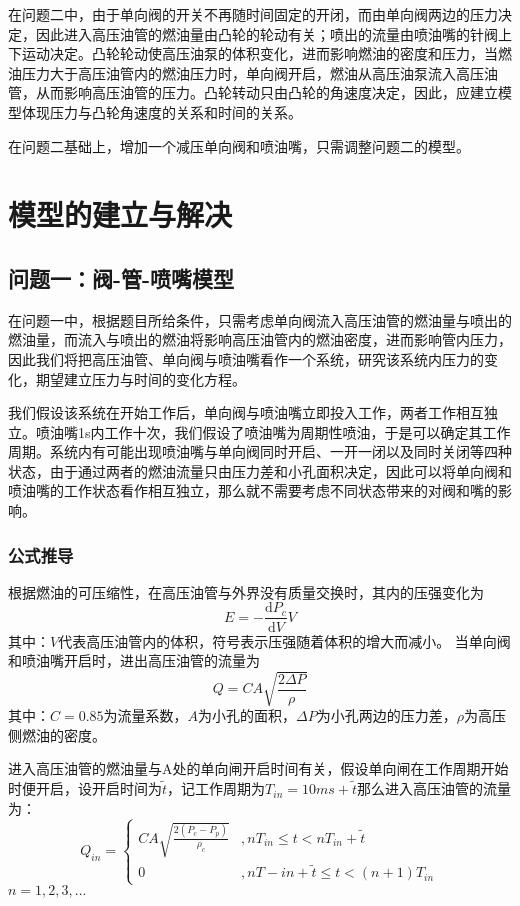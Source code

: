 \documentclass[withoutpreface,bwprint]{cumcmthesis} %
\begin{document}
在问题二中，由于单向阀的开关不再随时间固定的开闭，而由单向阀两边的压力决定，因此进入高压油管的燃油量由凸轮的轮动有关；喷出的流量由喷油嘴的针阀上下运动决定。凸轮轮动使高压油泵的体积变化，进而影响燃油的密度和压力，当燃油压力大于高压油管内的燃油压力时，单向阀开启，燃油从高压油泵流入高压油管，从而影响高压油管的压力。凸轮转动只由凸轮的角速度决定，因此，应建立模型体现压力与凸轮角速度的关系和时间的关系。


在问题二基础上，增加一个减压单向阀和喷油嘴，只需调整问题二的模型。

 
\section{模型的建立与解决}
\subsection{问题一：阀-管-喷嘴模型}
在问题一中，根据题目所给条件，只需考虑单向阀流入高压油管的燃油量与喷出的燃油量，而流入与喷出的燃油将影响高压油管内的燃油密度，进而影响管内压力，因此我们将把高压油管、单向阀与喷油嘴看作一个系统，研究该系统内压力的变化，期望建立压力与时间的变化方程。

我们假设该系统在开始工作后，单向阀与喷油嘴立即投入工作，两者工作相互独立。喷油嘴1s内工作十次，我们假设了喷油嘴为周期性喷油，于是可以确定其工作周期。系统内有可能出现喷油嘴与单向阀同时开启、一开一闭以及同时关闭等四种状态，由于通过两者的燃油流量只由压力差和小孔面积决定，因此可以将单向阀和喷油嘴的工作状态看作相互独立，那么就不需要考虑不同状态带来的对阀和嘴的影响。
\subsubsection{公式推导}
根据燃油的可压缩性，在高压油管与外界没有质量交换时，其内的压强变化为
\begin{equation}
	E = -\frac{\mathrm{d}P_c}{\mathrm{d}V}V
\end{equation}
其中：$V$代表高压油管内的体积，符号表示压强随着体积的增大而减小。
当单向阀和喷油嘴开启时，进出高压油管的流量为
\begin{equation}
	Q = CA\sqrt{\frac{2\Delta P}{\rho}}
\end{equation}
其中：$C = 0.85$为流量系数，$A$为小孔的面积，$\Delta P$为小孔两边的压力差，$\rho$为高压侧燃油的密度。

进入高压油管的燃油量与A处的单向闸开启时间有关，假设单向闸在工作周期开始时便开启，设开启时间为$\widetilde{t}$，记工作周期为$T_{in} = 10ms + \widetilde{t}$那么进入高压油管的流量为：
\begin{equation}
	Q_{in} = \left\{ 
	\begin{array}{ll}
	CA\sqrt{\frac{2(P_c-P_p)}{\rho_c}}&,nT_{in}\leq t <nT_{in} + \widetilde{t} \\
	0&,nT
	-{in}+\widetilde{t}\leq t <(n+1)T_{in}
	\end{array}
	\right.
\end{equation}
$n = 1,2,3,...$
\end{document}
